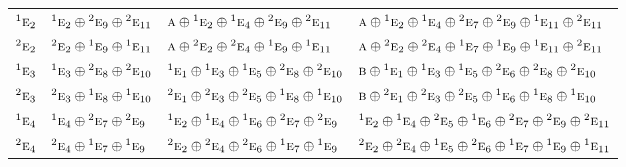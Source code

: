\documentclass[10pt,a4paper]{article}
\numberwithin{equation}{section}
\newcommand{\irr}[1]{\text{\normalfont\scshape #1}}
\newcommand{\conjpair}[1]{{}^{#1}}
\begin{document}
{\begin{longtable}{@{}llll@{}}
$\conjpair{1}\irr{e}_{2}$ & $\conjpair{1}\irr{e}_{2}\oplus \conjpair{2}\irr{e}_{9}\oplus \conjpair{2}\irr{e}_{11}$ & $\irr{a}\oplus \conjpair{1}\irr{e}_{2}\oplus \conjpair{1}\irr{e}_{4}\oplus \conjpair{2}\irr{e}_{9}\oplus \conjpair{2}\irr{e}_{11}$ & $\irr{a}\oplus \conjpair{1}\irr{e}_{2}\oplus \conjpair{1}\irr{e}_{4}\oplus \conjpair{2}\irr{e}_{7}\oplus \conjpair{2}\irr{e}_{9}\oplus \conjpair{1}\irr{e}_{11}\oplus \conjpair{2}\irr{e}_{11}$\\
$\conjpair{2}\irr{e}_{2}$ & $\conjpair{2}\irr{e}_{2}\oplus \conjpair{1}\irr{e}_{9}\oplus \conjpair{1}\irr{e}_{11}$ & $\irr{a}\oplus \conjpair{2}\irr{e}_{2}\oplus \conjpair{2}\irr{e}_{4}\oplus \conjpair{1}\irr{e}_{9}\oplus \conjpair{1}\irr{e}_{11}$ & $\irr{a}\oplus \conjpair{2}\irr{e}_{2}\oplus \conjpair{2}\irr{e}_{4}\oplus \conjpair{1}\irr{e}_{7}\oplus \conjpair{1}\irr{e}_{9}\oplus \conjpair{1}\irr{e}_{11}\oplus \conjpair{2}\irr{e}_{11}$\\
$\conjpair{1}\irr{e}_{3}$ & $\conjpair{1}\irr{e}_{3}\oplus \conjpair{2}\irr{e}_{8}\oplus \conjpair{2}\irr{e}_{10}$ & $\conjpair{1}\irr{e}_{1}\oplus \conjpair{1}\irr{e}_{3}\oplus \conjpair{1}\irr{e}_{5}\oplus \conjpair{2}\irr{e}_{8}\oplus \conjpair{2}\irr{e}_{10}$ & $\irr{b}\oplus \conjpair{1}\irr{e}_{1}\oplus \conjpair{1}\irr{e}_{3}\oplus \conjpair{1}\irr{e}_{5}\oplus \conjpair{2}\irr{e}_{6}\oplus \conjpair{2}\irr{e}_{8}\oplus \conjpair{2}\irr{e}_{10}$\\
$\conjpair{2}\irr{e}_{3}$ & $\conjpair{2}\irr{e}_{3}\oplus \conjpair{1}\irr{e}_{8}\oplus \conjpair{1}\irr{e}_{10}$ & $\conjpair{2}\irr{e}_{1}\oplus \conjpair{2}\irr{e}_{3}\oplus \conjpair{2}\irr{e}_{5}\oplus \conjpair{1}\irr{e}_{8}\oplus \conjpair{1}\irr{e}_{10}$ & $\irr{b}\oplus \conjpair{2}\irr{e}_{1}\oplus \conjpair{2}\irr{e}_{3}\oplus \conjpair{2}\irr{e}_{5}\oplus \conjpair{1}\irr{e}_{6}\oplus \conjpair{1}\irr{e}_{8}\oplus \conjpair{1}\irr{e}_{10}$\\
$\conjpair{1}\irr{e}_{4}$ & $\conjpair{1}\irr{e}_{4}\oplus \conjpair{2}\irr{e}_{7}\oplus \conjpair{2}\irr{e}_{9}$ & $\conjpair{1}\irr{e}_{2}\oplus \conjpair{1}\irr{e}_{4}\oplus \conjpair{1}\irr{e}_{6}\oplus \conjpair{2}\irr{e}_{7}\oplus \conjpair{2}\irr{e}_{9}$ & $\conjpair{1}\irr{e}_{2}\oplus \conjpair{1}\irr{e}_{4}\oplus \conjpair{2}\irr{e}_{5}\oplus \conjpair{1}\irr{e}_{6}\oplus \conjpair{2}\irr{e}_{7}\oplus \conjpair{2}\irr{e}_{9}\oplus \conjpair{2}\irr{e}_{11}$\\
$\conjpair{2}\irr{e}_{4}$ & $\conjpair{2}\irr{e}_{4}\oplus \conjpair{1}\irr{e}_{7}\oplus \conjpair{1}\irr{e}_{9}$ & $\conjpair{2}\irr{e}_{2}\oplus \conjpair{2}\irr{e}_{4}\oplus \conjpair{2}\irr{e}_{6}\oplus \conjpair{1}\irr{e}_{7}\oplus \conjpair{1}\irr{e}_{9}$ & $\conjpair{2}\irr{e}_{2}\oplus \conjpair{2}\irr{e}_{4}\oplus \conjpair{1}\irr{e}_{5}\oplus \conjpair{2}\irr{e}_{6}\oplus \conjpair{1}\irr{e}_{7}\oplus \conjpair{1}\irr{e}_{9}\oplus \conjpair{1}\irr{e}_{11}$\\

\end{longtable}}
\end{document}
